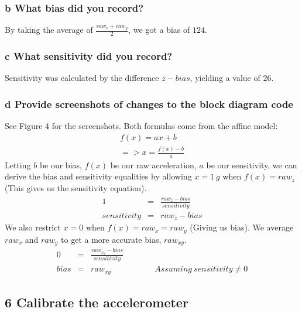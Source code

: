 \documentclass[10pt,a4paper]{article}
\begin{document}
    \subsubsection*{b What bias did you record?}
    By taking the average of $\frac{raw_{x} + raw_{y}}{2}$, we got a bias of $124$. 
    \subsubsection*{c What sensitivity did you record?}
    Sensitivity was calculated by the difference $z - bias$, yielding a value of $26$.
    \subsubsection*{d Provide screenshots of changes to the block diagram code}
    See Figure 4 for the screenshots. Both formulas come from the affine model:
    \begin{eqnarray}
        f(x) = ax + b \\
           => x = \frac{f(x) - b}{a}
    \end{eqnarray}
    Letting $b$ be our bias, $f(x)$ be our raw acceleration, $a$ be our sensitivity, we can derive the bias and sensitivity equalities by allowing $x = 1\ g$ when $f(x) = raw_{z}$ (This gives us the sensitivity equation). 
    \begin{eqnarray}
        1 &=& \frac{raw_{z} - bias}{sensitivity} \\
        sensitivity &=& raw_{z} - bias
    \end{eqnarray}
    We also restrict $x = 0$ when $f(x) = raw_{x} = raw_{y}$ (Giving us bias). We average $raw_{x}$ and $raw_{y}$ to get a more accurate bias, $raw_{xy}$. 
    \begin{eqnarray}
        0 &=& \frac{raw_{xy} - bias}{sensitivity} \\
        bias &=& raw_{xy}  \ \ \ \ \ \ \ \ \ \ \ \ \ \ \ \ \ \ \ \ \ \ \ \ Assuming\ sensitivity \neq 0
    \end{eqnarray}

  \subsection*{6 Calibrate the accelerometer}
\end{document}
